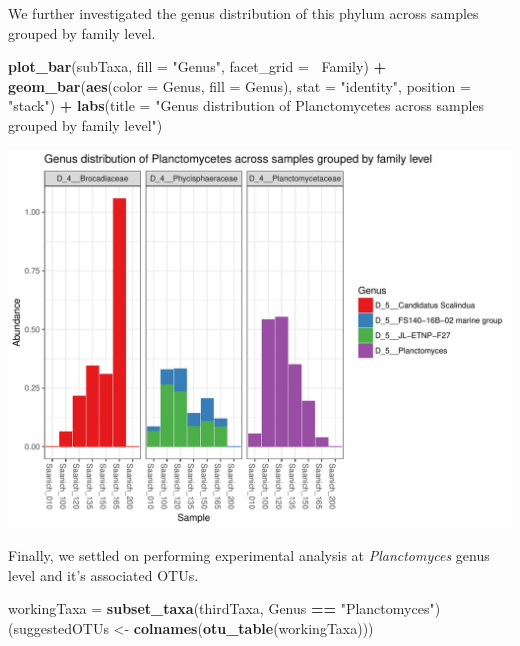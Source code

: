 \documentclass[11 pt,]{article}
\newenvironment{Shaded}{\begin{snugshade}}{\end{snugshade}}
\newcommand{\KeywordTok}[1]{\textcolor[rgb]{0.13,0.29,0.53}{\textbf{#1}}}
\newcommand{\DataTypeTok}[1]{\textcolor[rgb]{0.13,0.29,0.53}{#1}}
\newcommand{\StringTok}[1]{\textcolor[rgb]{0.31,0.60,0.02}{#1}}
\newcommand{\OperatorTok}[1]{\textcolor[rgb]{0.81,0.36,0.00}{\textbf{#1}}}
\newcommand{\NormalTok}[1]{#1}
\begin{document}
We further investigated the genus distribution of this phylum across
samples grouped by family level.

\begin{Shaded}
\begin{Highlighting}[]
\KeywordTok{plot_bar}\NormalTok{(subTaxa, }\DataTypeTok{fill =} \StringTok{"Genus"}\NormalTok{, }\DataTypeTok{facet_grid =} \OperatorTok{~}\NormalTok{Family) }\OperatorTok{+}\StringTok{ }\KeywordTok{geom_bar}\NormalTok{(}\KeywordTok{aes}\NormalTok{(}\DataTypeTok{color =}\NormalTok{ Genus, }
    \DataTypeTok{fill =}\NormalTok{ Genus), }\DataTypeTok{stat =} \StringTok{"identity"}\NormalTok{, }\DataTypeTok{position =} \StringTok{"stack"}\NormalTok{) }\OperatorTok{+}\StringTok{ }\KeywordTok{labs}\NormalTok{(}\DataTypeTok{title =} \StringTok{"Genus distribution of Planctomycetes across samples grouped by family level"}\NormalTok{)}
\end{Highlighting}
\end{Shaded}

\includegraphics{Figs/unnamed-chunk-10-1.pdf}

Finally, we settled on performing experimental analysis at
\emph{Planctomyces} genus level and it's associated OTUs.

\begin{Shaded}
\begin{Highlighting}[]
\NormalTok{workingTaxa =}\StringTok{ }\KeywordTok{subset_taxa}\NormalTok{(thirdTaxa, Genus }\OperatorTok{==}\StringTok{ "Planctomyces"}\NormalTok{)}
\NormalTok{(suggestedOTUs <-}\StringTok{ }\KeywordTok{colnames}\NormalTok{(}\KeywordTok{otu_table}\NormalTok{(workingTaxa)))}
\end{Highlighting}
\end{Shaded}
\end{document}
